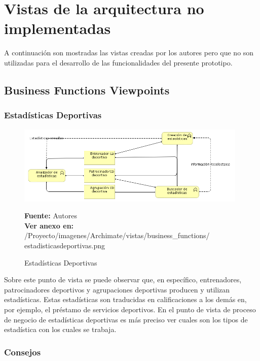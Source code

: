 \chapter{Vistas de la arquitectura no implementadas}
\label{app:vistas_no_implementadas}

A continuación son mostradas las vistas creadas por los autores pero que no son utilizadas para el desarrollo de las funcionalidades del presente prototipo.

\section{Business Functions Viewpoints}

\subsection{Estadísticas Deportivas}

\begin{figure}[!htb]
  \begin{center}
    \includegraphics[width=11cm]{./imagenes/Archimate/vistas/business_functions/estadisticasdeportivas.png}
    \caption{Estadísticas Deportivas}
    \label{fig:bf_estadisticas_deportivas}
    \textbf{Fuente:}  Autores \\
    \textbf{Ver anexo en:} /Proyecto/imagenes/Archimate/vistas/business\_functions/
    estadisticasdeportivas.png
  \end{center}
\end{figure}

Sobre este punto de vista se puede observar que, en específico, entrenadores, patrocinadores deportivos y agrupaciones deportivas producen y utilizan estadísticas. Estas estadísticas son traducidas en calificaciones a los demás en, por ejemplo, el préstamo de servicios deportivos. En el punto de vista de proceso de negocio de estadísticas deportivas es más preciso ver cuales son los tipos de estadística con los cuales se trabaja.

\subsection{Consejos}

